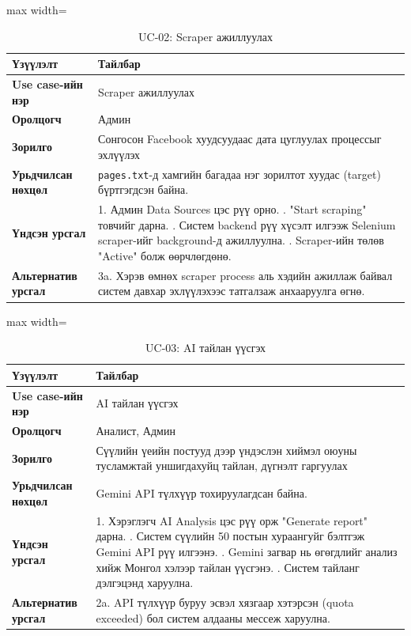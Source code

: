 \begin{table}[H]
\centering
\caption{UC-02: Scraper ажиллуулах}
\small
\begin{adjustbox}{max width=\textwidth}
\begin{tabular}{|p{3cm}|p{10cm}|}
\hline
\rowcolor{gray!20}\textbf{Үзүүлэлт} & \textbf{Тайлбар} \\ \hline
\textbf{Use case-ийн нэр} & Scraper ажиллуулах \\ \hline
\textbf{Оролцогч} & Админ \\ \hline
\textbf{Зорилго} & Сонгосон Facebook хуудсуудаас дата цуглуулах процессыг эхлүүлэх \\ \hline
\textbf{Урьдчилсан нөхцөл} & \texttt{pages.txt}-д хамгийн багадаа нэг зорилтот хуудас (target) бүртгэгдсэн байна. \\ \hline
\textbf{Үндсэн урсгал} & 1. Админ Data Sources цэс рүү орно. \newline 2. "Start scraping" товчийг дарна. \newline 3. Систем backend рүү хүсэлт илгээж Selenium scraper-ийг background-д ажиллуулна. \newline 4. Scraper-ийн төлөв "Active" болж өөрчлөгдөнө. \\ \hline
\textbf{Альтернатив урсгал} & 3a. Хэрэв өмнөх scraper process аль хэдийн ажиллаж байвал систем давхар эхлүүлэхээс татгалзаж анхааруулга өгнө. \\ \hline
\end{tabular}
\end{adjustbox}
\normalsize
\end{table}

\begin{table}[H]
\centering
\caption{UC-03: AI тайлан үүсгэх}
\small
\begin{adjustbox}{max width=\textwidth}
\begin{tabular}{|p{3cm}|p{10cm}|}
\hline
\rowcolor{gray!20}\textbf{Үзүүлэлт} & \textbf{Тайлбар} \\ \hline
\textbf{Use case-ийн нэр} & AI тайлан үүсгэх \\ \hline
\textbf{Оролцогч} & Аналист, Админ \\ \hline
\textbf{Зорилго} & Сүүлийн үеийн постууд дээр үндэслэн хиймэл оюуны тусламжтай уншигдахуйц тайлан, дүгнэлт гаргуулах \\ \hline
\textbf{Урьдчилсан нөхцөл} & Gemini API түлхүүр тохируулагдсан байна. \\ \hline
\textbf{Үндсэн урсгал} & 1. Хэрэглэгч AI Analysis цэс рүү орж "Generate report" дарна. \newline 2. Систем сүүлийн 50 постын хураангуйг бэлтгэж Gemini API рүү илгээнэ. \newline 3. Gemini загвар нь өгөгдлийг анализ хийж Монгол хэлээр тайлан үүсгэнэ. \newline 4. Систем тайланг дэлгэцэнд харуулна. \\ \hline
\textbf{Альтернатив урсгал} & 2a. API түлхүүр буруу эсвэл хязгаар хэтэрсэн (quota exceeded) бол систем алдааны мессеж харуулна. \\ \hline
\end{tabular}
\end{adjustbox}
\normalsize
\end{table}

